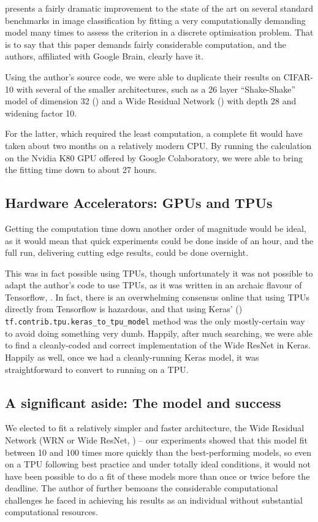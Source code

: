 \documentclass[10pt,twocolumn,letterpaper]{article}
\begin{document}
  \cite{Cubuk2018} presents a fairly dramatic improvement to the state of the art on several standard benchmarks in image classification by fitting a very computationally demanding model many times to assess the criterion in a discrete optimisation problem. That is to say that this paper demands fairly considerable computation, and the authors, affiliated with Google Brain, clearly have it.

  Using the author's source code, we were able to duplicate their results on CIFAR-10 with several of the smaller architectures, such as a 26 layer ``Shake-Shake'' model of dimension 32 (\cite{Gastaldi2017}) and a Wide Residual Network (\cite{Zagoruyko2016}) with depth 28 and widening factor 10.

  For the latter, which required the least computation, a complete fit would have taken about two months on a relatively modern CPU. By running the calculation on the Nvidia K80 GPU offered by Google Colaboratory, we were able to bring the fitting time down to about 27 hours.

  \subsection{Hardware Accelerators: GPUs and TPUs}
    Getting the computation time down another order of magnitude would be ideal, as it would mean that quick experiments could be done inside of an hour, and the full run, delivering cutting edge results, could be done overnight.

    This was in fact possible using TPUs, though unfortunately it was not possible to adapt the \cite{Cubuk2018} author's code to use TPUs, as it was written in an archaic flavour of Tensorflow, \cite{Abadi2016}. In fact, there is an overwhelming consensus online that using TPUs directly from Tensorflow is hazardous, and that using Keras' (\cite{Chollet2015}) \texttt{tf.contrib.tpu.keras\_to\_tpu\_model} method was the only mostly-certain way to avoid doing something very dumb. Happily, after much searching, we were able to find a cleanly-coded and correct implementation of the Wide ResNet in Keras. Happily as well, once we had a cleanly-running Keras model, it was straightforward to convert to running on a TPU.

  \subsection{A significant aside: The model and success}
    We elected to fit a relatively simpler and faster architecture, the Wide Residual Network (WRN or Wide ResNet, \cite{Zagoruyko2016}) -- our experiments showed that this model fit between 10 and 100 times more quickly than the best-performing models, so even on a TPU following best practice and under totally ideal conditions, it would not have been possible to do a fit of these models more than once or twice before the deadline. The author of \cite{Gastaldi2017} further bemoans the considerable computational challenges he faced in achieving his results as an individual without substantial computational resources.
\end{document}
